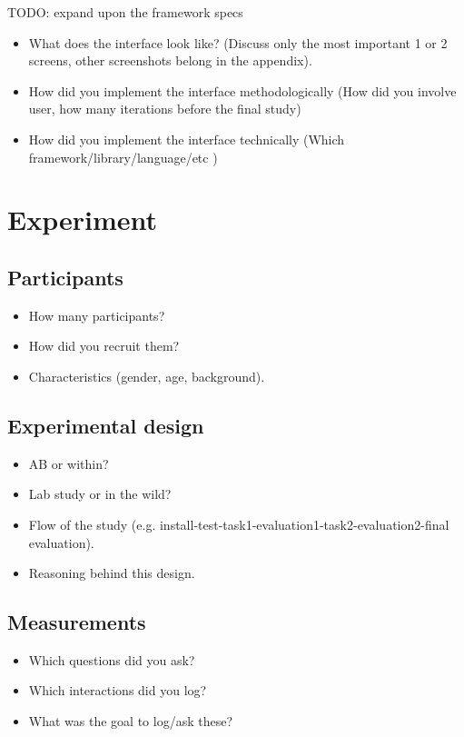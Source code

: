 \documentclass[sigconf,nonacm]{acmart}
\begin{document}
TODO: expand upon the framework specs

\begin{itemize}
    \item What does the interface look like? (Discuss only the most important 1 or 2 screens, other screenshots belong in the appendix).
    \item How did you implement the interface methodologically (How did you involve user, how many iterations before the final study)
    \item How did you implement the interface technically (Which framework/library/language/etc )
\end{itemize}

\section{Experiment}
\subsection{Participants}
\begin{itemize}
    \item How many participants?
    \item How did you recruit them?
    \item Characteristics (gender, age, background).
\end{itemize}

\subsection{Experimental design}
\begin{itemize}
    \item AB or within?
    \item Lab study or in the wild?
    \item Flow of the study (e.g. install-test-task1-evaluation1-task2-evaluation2-final evaluation).
    \item Reasoning behind this design.
\end{itemize}

\subsection{Measurements}
\begin{itemize}
    \item Which questions did you ask?
    \item Which interactions did you log?
    \item What was the goal to log/ask these?
\end{itemize}
\end{document}
